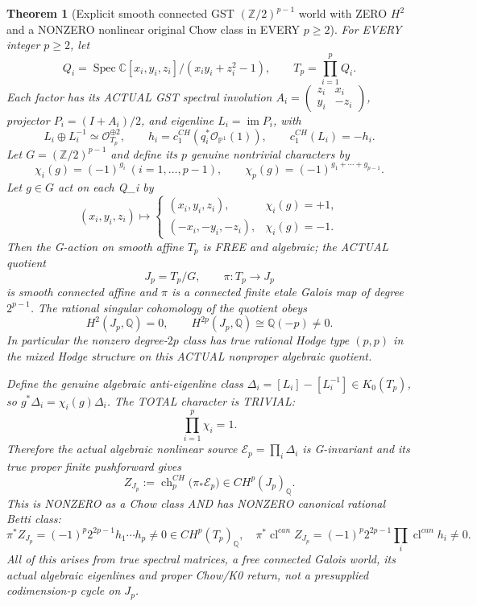 \documentclass[11pt]{article}
\newtheorem{theorem}{Theorem}
\begin{document}
\begin{theorem}[Explicit smooth connected GST $(\mathbb Z/2)^{p-1}$ world with ZERO $H^2$ and a NONZERO nonlinear original Chow class in EVERY $p\ge2$]
For EVERY integer $p\ge2$, let
\[
 Q_i=\operatorname{Spec}
       \mathbb C[x_i,y_i,z_i]/(x_iy_i+z_i^2-1),
 \qquad T_p=\prod_{i=1}^{p}Q_i .
\]
Each factor has its ACTUAL GST spectral involution
$A_i=\begin{pmatrix}z_i&x_i\\y_i&-z_i\end{pmatrix}$,
projector $P_i=(I+A_i)/2$, and eigenline
$L_i=\operatorname{im}P_i$, with
\[
 L_i\oplus L_i^{-1}\simeq\mathcal O_{T_p}^{\oplus2},
 \qquad h_i=c_1^{CH}(q_i^*\mathcal O_{\mathbb P^1}(1)),
 \qquad c_1^{CH}(L_i)=-h_i .
\]
Let $G=(\mathbb Z/2)^{p-1}$ and define its
$p$ genuine nontrivial characters by
\[
 \chi_i(g)=(-1)^{g_i}\ (i=1,\ldots,p-1),
 \qquad
 \chi_p(g)=(-1)^{g_1+\cdots+g_{p-1}} .
\]
Let $g\in G$ act on each Q_i by
\[
 (x_i,y_i,z_i)\mapsto
 \begin{cases}
 (x_i,y_i,z_i),&\chi_i(g)=+1,\\
 (-x_i,-y_i,-z_i),&\chi_i(g)=-1.
 \end{cases}
\]
Then the G-action on smooth affine $T_p$ is
FREE and algebraic; the ACTUAL quotient
\[
 \boxed{J_p=T_p/G,\qquad
       \pi:T_p\to J_p}
\]
is smooth connected affine and
$\pi$ is a connected finite etale
Galois map of degree $2^{p-1}$.
The rational singular cohomology of the quotient obeys
\[
 \boxed{
 H^2(J_p,\mathbb Q)=0,\qquad
 H^{2p}(J_p,\mathbb Q)\cong\mathbb Q(-p)\ne0 .
 }                                                    \tag{23}
\]
In particular the nonzero degree-$2p$
class has true rational Hodge type $(p,p)$
in the mixed Hodge structure on this
ACTUAL nonproper algebraic quotient.

Define the genuine algebraic anti-eigenline
class $\Delta_i=[L_i]-[L_i^{-1}]
\in K_0(T_p)$, so $g^*\Delta_i
=\chi_i(g)\Delta_i$.
The TOTAL character is TRIVIAL:
\[
 \prod_{i=1}^{p}\chi_i=1 .
\]
Therefore the actual algebraic nonlinear
source $\mathcal E_p=\prod_i\Delta_i$
is G-invariant and its true proper
finite pushforward gives
\[
 \boxed{
 Z_{J_p}:=
   \operatorname{ch}^{CH}_p
       \bigl(\pi_*\mathcal E_p\bigr)
   \in CH^p(J_p)_{\mathbb Q}.
 }                                                   \tag{24}
\]
This is NONZERO as a Chow class AND
has NONZERO canonical rational Betti class:
\[
 \boxed{
 \pi^*Z_{J_p}
  =(-1)^p 2^{2p-1}h_1\cdots h_p
  \ne0\in CH^p(T_p)_{\mathbb Q},
 \quad
 \pi^*\operatorname{cl}^{can}Z_{J_p}
  =(-1)^p 2^{2p-1}\prod_i
             \operatorname{cl}^{can}h_i\ne0 .
 }                                                   \tag{25}
\]
All of this arises from true spectral
matrices, a free connected Galois
world, its actual algebraic eigenlines
and proper Chow/K0 return, not a
presupplied codimension-p cycle
on $J_p$.


\end{theorem}
\end{document}
